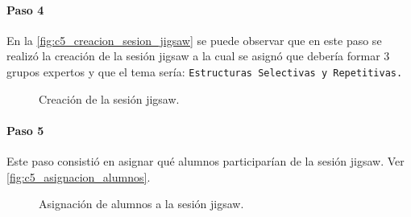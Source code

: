 \paragraph{Paso 4}
En la \autoref{fig:c5_creacion_sesion_jigsaw} se puede observar que en este paso se realizó la creación de la sesión jigsaw a la cual se asignó que debería formar 3 grupos expertos y que el tema sería: \texttt{Estructuras Selectivas y Repetitivas.} 

\begin{figure}[h!]
	\centering
	\caption{Creación de la sesión jigsaw.}
	\label{fig:c5_creacion_sesion_jigsaw}
\end{figure}

\paragraph{Paso 5}
Este paso consistió en asignar qué alumnos participarían de la sesión jigsaw. Ver \autoref{fig:c5_asignacion_alumnos}.

\begin{figure}[h!]
	\centering
	\caption{Asignación de alumnos a la sesión jigsaw.}
	\label{fig:c5_asignacion_alumnos}
\end{figure}

